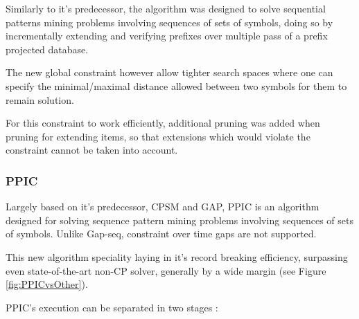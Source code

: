 \documentclass{eplmastersthesis}
\begin{document}
Similarly to it's predecessor, the algorithm was designed to solve sequential patterns mining problems involving sequences of sets of symbols, doing so by incrementally extending and verifying prefixes over multiple pass of a prefix projected database. \newline

The new global constraint however allow tighter search spaces where one can specify the minimal/maximal distance allowed between two symbols for them to remain solution. \newline

For this constraint to work efficiently, additional pruning was added when pruning for extending items, so that extensions which would violate the constraint cannot be taken into account.

\subsubsection{PPIC}

Largely based on it's predecessor, CPSM and GAP, PPIC is an algorithm designed for solving sequence pattern mining problems involving sequences of sets of symbols. Unlike Gap-seq, constraint over time gaps are not supported. \newline

This new algorithm speciality laying in it's record breaking efficiency, surpassing even state-of-the-art non-CP solver, generally by a wide margin (see Figure \ref{fig:PPICvsOther}).

PPIC's execution can be separated in two stages :
\end{document}

